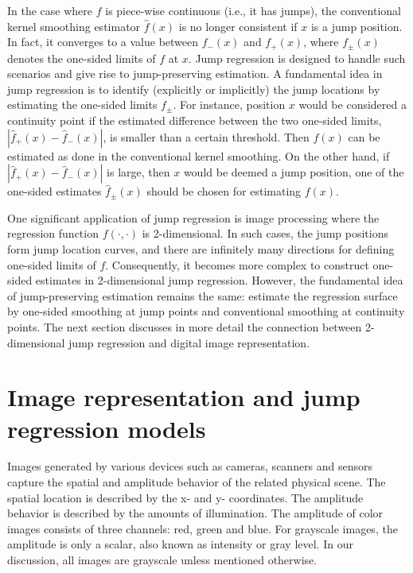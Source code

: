 In the case where \(f\) is piece-wise continuous (i.e., it has jumps), the conventional kernel smoothing estimator \(\widehat{f}(x)\) is no longer consistent if \(x\) is a jump position. In fact, it converges to a value between \(f_{-}(x)\) and \(f_{+}(x)\), where \(f_{\pm} (x)\) denotes the one-sided limits of \(f\) at \(x\). Jump regression is designed to handle such scenarios and give rise to jump-preserving estimation. A fundamental idea in jump regression is to identify (explicitly or implicitly) the jump locations by estimating the one-sided limits \(f_{\pm}\). For instance, position \(x\) would be considered a continuity point if the estimated difference between the two one-sided limits, \(|\widehat{f}_+(x) - \widehat{f}_{-}(x)|\), is smaller than a certain threshold. Then \(f(x)\) can be estimated as done in the conventional kernel smoothing. On the other hand, if \(|\widehat{f}_+(x) - \widehat{f}_{-}(x)|\) is large, then \(x\) would be deemed a jump position, one of the one-sided estimates \(\widehat{f}_{\pm}(x)\) should be chosen for estimating \(f(x)\).

One significant application of jump regression is image processing where the regression function \(f(\cdot, \cdot)\) is 2-dimensional. In such cases, the jump positions form jump location curves, and there are infinitely many directions for defining one-sided limits of \(f\). Consequently, it becomes more complex to construct one-sided estimates in 2-dimensional jump regression. However, the fundamental idea of jump-preserving estimation remains the same: estimate the regression surface by one-sided smoothing at jump points and conventional smoothing at continuity points. The next section discusses in more detail the connection between 2-dimensional jump regression and digital image representation.

\section{Image representation and jump regression models}\label{sec:models}

Images generated by various devices such as cameras, scanners and sensors capture the spatial and amplitude behavior of the related physical scene. The spatial location is described by the x- and y- coordinates. The amplitude behavior is described by the amounts of illumination. The amplitude of color images consists of three channels: red, green and blue. For grayscale images, the amplitude is only a scalar, also known as intensity or gray level. In our discussion, all images are grayscale unless mentioned otherwise.

